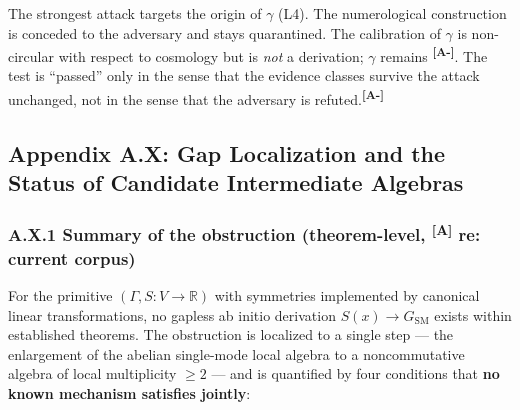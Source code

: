 \documentclass[12pt,a4paper,twoside]{article}
\theoremstyle{plain}
\theoremstyle{definition}
\theoremstyle{remark}
\newcommand{\catmark}[1]{\textsuperscript{\textsf{\textbf{[#1]}}}}
\begin{document}
\begin{governancebox}
The strongest attack targets the origin of $\gamma$ (L4). The numerological construction is conceded to the adversary and stays quarantined. The calibration of $\gamma$ is non-circular with respect to cosmology but is \emph{not} a derivation; $\gamma$ remains \catmark{A-}. The test is ``passed'' only in the sense that the evidence classes survive the attack unchanged, not in the sense that the adversary is refuted.\catmark{A-}
\end{governancebox}



\subsection*{Appendix A.X: Gap Localization and the Status of Candidate Intermediate Algebras}

\subsubsection*{A.X.1 Summary of the obstruction (theorem-level, \catmark{A} re: current corpus)}

For the primitive $(\Gamma, S\!:\!V\to\mathbb{R})$ with symmetries implemented by canonical linear transformations, no gapless ab initio derivation $S(x)\to G_{\mathrm{SM}}$ exists within established theorems. The obstruction is localized to a single step — the enlargement of the abelian single-mode local algebra to a noncommutative algebra of local multiplicity $\geq 2$ — and is quantified by four conditions that \textbf{no known mechanism satisfies jointly}:
\end{document}
